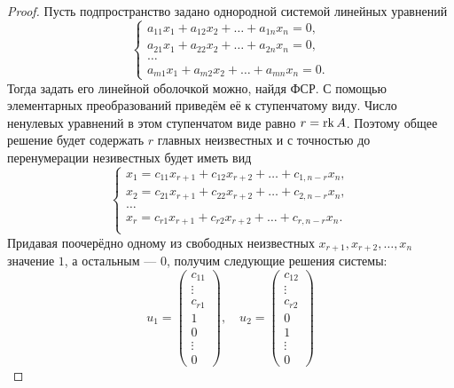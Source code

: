 \begin{proof}
    Пусть подпространство задано однородной системой линейных уравнений
    \[
        \begin{cases}
            a_{11}x_1 + a_{12}x_2 + \ldots + a_{1n}x_n = 0,\\
            a_{21}x_1 + a_{22}x_2 + \ldots + a_{2n}x_n = 0,\\
            \ldots\\
            a_{m1}x_1 + a_{m2}x_2 + \ldots + a_{mn}x_n = 0.
        \end{cases}
    \]
    Тогда задать его линейной оболочкой можно, найдя ФСР. С помощью элементарных преобразований приведём её к ступенчатому виду. Число ненулевых уравнений в этом ступенчатом виде равно $r = \operatorname{rk} A$. Поэтому общее решение будет содержать $r$ главных неизвестных и с точностью до перенумерации незивестных будет иметь вид
    \[
        \begin{cases}
            x_1 = c_{11}x_{r + 1} + c_{12}x_{r + 2} + \ldots + c_{1, n - r}x_n,\\
            x_2 = c_{21}x_{r + 1} + c_{22}x_{r + 2} + \ldots + c_{2, n - r}x_n,\\
            \ldots\\
            x_r = c_{r1}x_{r + 1} + c_{r2}x_{r + 2} + \ldots + c_{r, n - r}x_n.\\
        \end{cases}
    \]
    Придавая поочерёдно одному из свободных неизвестных $x_{r + 1}, x_{r + 2}, \ldots, x_n$ значение $1$, а остальным --- $0$, получим следующие решения системы:
    \[
        u_1 = 
        \begin{pmatrix}
            c_{11}\\
            \vdots\\
            c_{r1}\\
            1\\
            0\\
            \vdots\\
            0
        \end{pmatrix},\quad
        u_2 = 
        \begin{pmatrix}
            c_{12}\\
            \vdots\\
            c_{r2}\\
            0\\
            1\\
            \vdots\\
            0

\end{pmatrix}\]
\end{proof}

